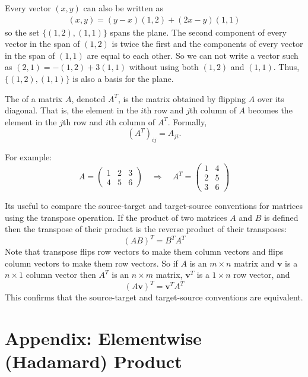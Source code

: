    Every vector $(x,y)$ can also be written as
\begin{eqnarray*}
 (x,y) =(y-x)(1,2) +(2x-y)(1,1)
\end{eqnarray*}  
so the set $\{ (1,2), (1,1) \}$ spans the plane. The second component of every
vector in the span of $(1,2)$ is twice the first and the components of every 
vector in the span of $(1,1)$ are equal to each other. So we can not write a
vector such as $(2,1) = -(1,2)+3 (1,1)$ without using both $(1,2)$ and $(1,1)$.
Thus, $\{ (1,2), (1,1) \}$ is also a basis for the plane. 

The  of a matrix \( A \), denoted \( A^T \), is the matrix obtained by flipping \( A \) over its diagonal. That is, the element in the \( i \)th row and \( j \)th column of \( A \) becomes the element in the \( j \)th row and \( i \)th column of \( A^T \). Formally, 
\[
(A^T)_{ij} = A_{ji}.
\]

For example: 
\[
A = \begin{pmatrix}
1 & 2 & 3 \\
4 & 5 & 6
\end{pmatrix}
\quad \Rightarrow \quad
A^T = \begin{pmatrix}
1 & 4 \\
2 & 5 \\
3 & 6
\end{pmatrix}
\]

   Its useful to compare the source-target and target-source conventions for 
matrices using the transpose operation. If the product of two matrices $A$ and 
$B$ is defined then the transpose of their product is the reverse product of 
their transposes:
\begin{equation*}
       \left(AB\right)^T = B^T A^T                 
\end{equation*}
Note that transpose flips row vectors to make them column vectors and flips
column vectors to make them row vectors. So if $A$ is an $m \times n$ matrix 
and $\mathbf{v}$ is a $n \times 1$ column vector then $A^T$ is an $n \times m$
matrix, $\mathbf{v}^T$ is a $1 \times n$ row vector, and
\begin{equation*}
       \left(A \mathbf{v} \right)^T =  \mathbf{v}^T A^T                 
\end{equation*}
This confirms that the source-target and target-source conventions are
equivalent.

\section{Appendix: Elementwise (Hadamard) Product}\label{hadamard}

